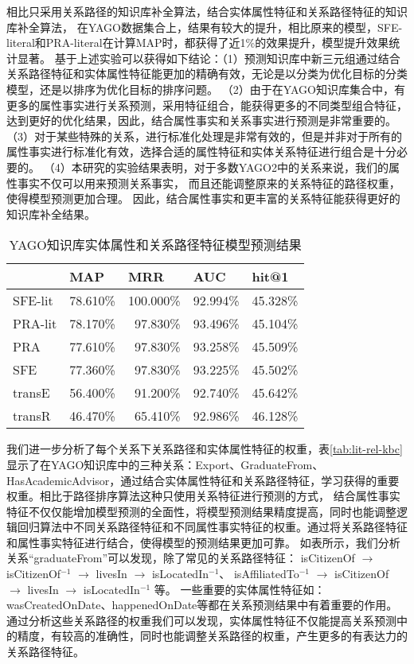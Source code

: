 相比只采用关系路径的知识库补全算法，结合实体属性特征和关系路径特征的知识库补全算法，
在YAGO数据集合上，结果有较大的提升，相比原来的模型，SFE-literal和PRA-literal在计算MAP时，都获得了近1\%的效果提升，模型提升效果统计显著。
基于上述实验可以获得如下结论：（1）预测知识库中新三元组通过结合关系路径特征和实体属性特征能更加的精确有效，无论是以分类为优化目标的分类模型，还是以排序为优化目标的排序问题。
（2）由于在YAGO知识库集合中，有更多的属性事实进行关系预测，采用特征组合，能获得更多的不同类型组合特征，达到更好的优化结果，因此，结合属性事实和关系事实进行预测是非常重要的。
（3）对于某些特殊的关系，进行标准化处理是非常有效的，但是并非对于所有的属性事实进行标准化有效，选择合适的属性特征和实体关系特征进行组合是十分必要的。
（4）本研究的实验结果表明，对于多数YAGO2中的关系来说，我们的属性事实不仅可以用来预测关系事实，
而且还能调整原来的关系特征的路径权重，使得模型预测更加合理。
因此，结合属性事实和更丰富的关系特征能获得更好的知识库补全结果。
\begin{table}[htbp]
  \centering
  \caption{YAGO知识库实体属性和关系路径特征模型预测结果}
    \begin{tabular}{|l|r|r|r|r|}
    \hline
          & \multicolumn{1}{l|}{MAP} & \multicolumn{1}{l|}{MRR} & \multicolumn{1}{l|}{AUC} & \multicolumn{1}{l|}{hit@1} \\
    \hline
    SFE-lit & 78.610\% & 100.000\% & 92.994\% & 45.328\% \\
    \hline
    PRA-lit & 78.170\% & 97.830\% & 93.496\% & 45.104\% \\
    \hline
    PRA   & 77.610\% & 97.830\% & 93.258\% & 45.509\% \\
    \hline
    SFE   & 77.360\% & 97.830\% & 93.225\% & 45.502\% \\
    \hline
    transE & 56.400\% & 91.200\% & 92.740\% & 45.642\% \\
    \hline
    transR & 46.470\% & 65.410\% & 92.986\% & 46.128\% \\
    \hline
    \end{tabular}%
  \label{tab:addlabel}%
\end{table}%


我们进一步分析了每个关系下关系路径和实体属性特征的权重，表\ref{tab:lit-rel-kbc}显示了在YAGO知识库中的三种关系：Export、GraduateFrom、HasAcademicAdvisor，通过结合实体属性特征和关系路径特征，学习获得的重要权重。相比于路径排序算法这种只使用关系特征进行预测的方式，
结合属性事实特征不仅仅能增加模型预测的全面性，将模型预测结果精度提高，同时也能调整逻辑回归算法中不同关系路径特征和不同属性事实特征的权重。通过将关系路径特征和属性事实特征进行结合，使得模型的预测结果更加可靠。
如表所示，我们分析关系“graduateFrom”可以发现，除了常见的关系路径特征：
isCitizenOf $\to$ isCitizenOf$^{-1}$ $\to$ livesIn $\to$ isLocatedIn$^{-1}$、
isAffiliatedTo$^{-1}$ $\to$ isCitizenOf $\to$ livesIn $\to$ isLocatedIn$^{-1}$
等。
一些重要的实体属性特征如：wasCreatedOnDate、happenedOnDate等都在关系预测结果中有着重要的作用。通过分析这些关系路径的权重我们可以发现，实体属性特征不仅能提高关系预测中的精度，有较高的准确性，同时也能调整关系路径的权重，产生更多的有表达力的关系路径特征。

